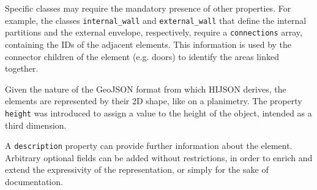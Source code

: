 Specific classes may require the mandatory presence of other properties. For
example, the classes \texttt{internal\_wall} and \texttt{external\_wall} that
define the internal partitions and the external envelope, respectively, require a \texttt{connections}
array, containing the IDs of the adjacent elements. This information is used
by the connector children of the element (e.g. doors) to identify the
areas linked together.

Given the nature of the GeoJSON format from which HIJSON derives, the elements
are represented by their 2D shape, like on a planimetry. The property {\tt
height} was introduced to assign a value to the height of the object, intended
as a third dimension.

A \texttt{description} property can provide further information about
the element.
Arbitrary optional fields can be added without restrictions, in order to
enrich and extend the expressivity of the representation, or simply for the sake of 
documentation.
